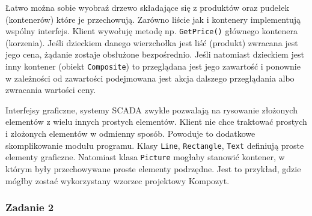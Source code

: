 Łatwo można sobie wyobraź drzewo składające się z produktów oraz pudełek (kontenerów) które je przechowują. Zarówno liście jak i kontenery implementują wspólny interfejs. Klient wywołuję metodę np. \texttt{GetPrice()} głównego kontenera (korzenia). Jeśli dzieckiem danego wierzchołka jest liść (produkt) zwracana jest jego cena, żądanie zostaje obsłużone bezpośrednio. Jeśli natomiast dzieckiem jest inny kontener (obiekt \texttt{Composite}) to przeglądana jest jego zawartość i ponownie w zależności od zawartości podejmowana jest akcja dalszego przeglądania albo zwracania wartości ceny.

Interfejsy graficzne, systemy SCADA zwykle pozwalają na rysowanie złożonych elementów z wielu innych prostych elementów. Klient nie chce traktować prostych i złożonych elementów w odmienny sposób. Powoduje to dodatkowe skomplikowanie modułu programu. Klasy \texttt{Line}, \texttt{Rectangle}, \texttt{Text} definiują proste elementy graficzne. Natomiast klasa \texttt{Picture} mogłaby stanowić kontener, w którym były przechowywane proste elementy podrzędne. Jest to przykład, gdzie mógłby zostać wykorzystany wzorzec projektowy Kompozyt.

\subsubsection{Zadanie 2}

